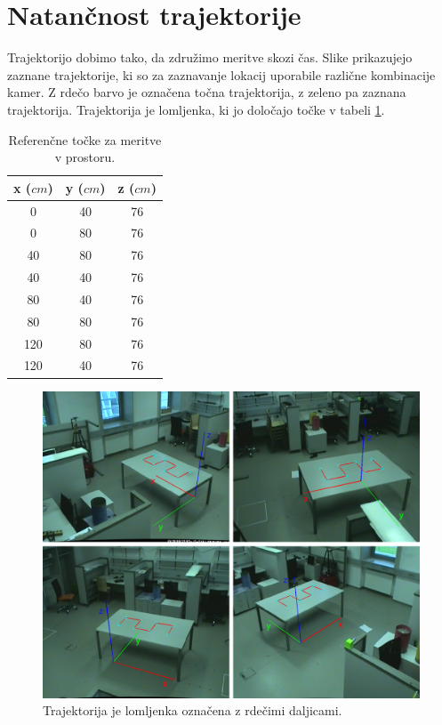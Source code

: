 \documentclass[a4paper, 12pt]{book}
\begin{document}
\section{Natančnost trajektorije}
Trajektorijo dobimo tako, da združimo meritve skozi čas. Slike prikazujejo zaznane trajektorije, ki so za zaznavanje lokacij uporabile različne kombinacije kamer. Z rdečo barvo je označena točna trajektorija, z zeleno pa zaznana trajektorija. Trajektorija je lomljenka, ki jo določajo točke v tabeli \ref{trajectory}.

\begin{table}[H]
\centering
\begin{tabular}{| c | c | c |}
\hline
x ($cm$) & y ($cm$) & z ($cm$) \\
\hline
0 & 40 & 76 \\
0 & 80 & 76 \\
40 & 80 & 76 \\
40 & 40 & 76 \\
80 & 40 & 76 \\
80 & 80 & 76 \\
120 & 80 & 76 \\
120 & 40 & 76 \\
\hline
\end{tabular}
\caption{Referenčne točke za meritve v prostoru.}
\label{trajectory}
\end{table}

\begin{figure}
\centering
\includegraphics[width=\textwidth,height=\textheight,keepaspectratio]{path_layout.png}
\caption{Trajektorija je lomljenka označena z rdečimi daljicami.}
\label{accuracy_points}
\end{figure}
\end{document}
